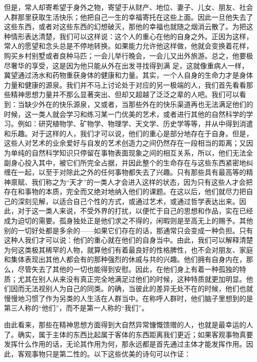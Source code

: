 \documentclass[12pt,oneside]{book}
\begin{document}
但是，常人却寄希望于身外之物，寄望于从财产、地位、妻子、儿女、朋友、社会人群那里获取生活快乐；他把自己一生的幸福寄托在这些上面。因此一旦他失去了这些东西，或者对这些东西的幻想破灭，那他的幸福也就随之烟消云散了。为把这种情形表达清楚，我们可以这样说：这个人的重心在他的自身之外。正因为这样，常人的愿望和念头总是不停地转换。如果能力允许他这样做，他就会变换着花样，购买乡村别墅或者良种马匹；一会儿举行晚会，一会儿又出外旅游。总之，他要极尽奢华的享受，这是因为他只能从外在出发寻找得到满
足，这就像重病人一样，冀望通过汤水和药物重获身体的健康和力量。其实，一个人自身的生命力才是身体力量和健康的源泉。我们并不马上讨论处于对应的另一极端的人，我们首先看看那些精神思想力量并不那么显著突出、但却又超越了泛泛之辈的人吧。我们可以看到：当缺少外在的快乐源泉，又或者，当那些外在的快乐渠道再也无法满足他们的时候，这一类人就会学习和练习某一门优美的艺术，或者进行其他的自然科学的学习。例如：研究植物学、矿物学、物理学、天文学、历史学等等，并从中得到消遣和乐趣。对于这样的人，我们才可以说，他们的重心是部分地存在于自身。但是，这些人对艺术的业余爱好与自发的艺术创造力之间仍然存在一段相当的距离；又因为单纯的自然科学知识只停留在事物表面现象之间的相互关系，所以，他们无法全副身心投入其中，被它们所完全占据，并因此整个的生命存在与这些东西紧密地纠缠在一起，以至于对除此之外的任何事物都失去了兴趣。只有那些具有最高等的精神禀赋、我们称之为“天才”的一类人才会进入这样的状态，因为只有这些人才会把存在和事物的本质，完全而又绝对地纳入他们的课题。在这以后，他们就尽力把自己的深刻见解，以适合自己个性的方式，或通过艺术，或通过哲学表达出来。因此，对于这一类人来说，不受外界的打扰，以便忙于自己的思想和作品，实在已经成为迫切的需要。孤身独处正是他们求之不得的，闲暇则是至高无上的赐予。其他别的一切好处都是多余的——如果它们存在的话，那通常只会变成一种负担。只有这种人我们才可以说：他们的重心就在他们的自身当中。由此，我们可以解释清楚为何这类极其稀罕的人物，就算他们有着最良好的性格脾性，也不会对朋友、家庭和集体表现出其他人都会有的那种强烈的休戚与共的兴趣。他们拥有自身内在，那么，尽管失去了其他的一切也能得到安慰。因此，在他们身上有着一种孤独的特质；尤其在别人从来没有真正完全地满足过他们的时候，这种特质就更加明显。他们因而无法视别人为自己的同类。的确，当彼此的差异无处不在的时候，他们也就慢慢地习惯了作为另类的人生活在人群当中。在称呼人群时，他们脑子里想到的是第三人称的“他们”，而不是第一人称的“我们”。 

由此看来，那些在精神思想方面得到大自然异常慷慨馈赠的人，也就是最幸运的人了。确实，属于主体的东西比起属于客体的东西距离我们更近；如果客观事物真要发挥什么作用的话，无论其作用为何，那永远都是首先通过主体才能发挥作用。因此，客观事物只是第二性的。以下这些优美的诗句可以作证： 
\end{document}
